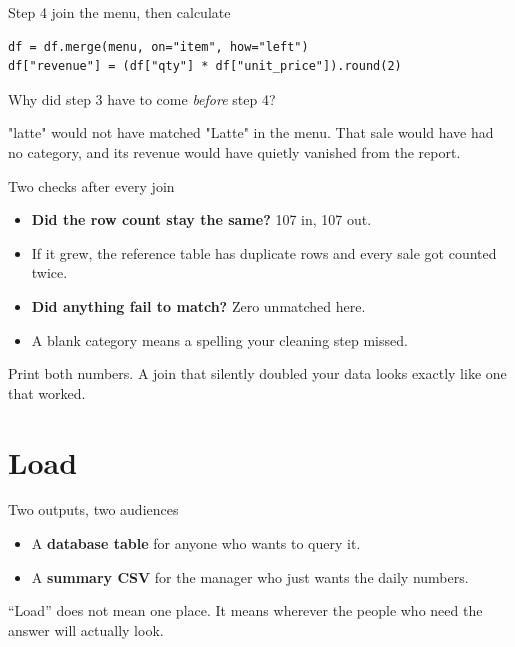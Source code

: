 \documentclass[aspectratio=169,10pt]{beamer}
\newcommand{\py}[1]{{\ttfamily\footnotesize\color{ink}#1}}
\begin{document}
\begin{frame}[fragile]{Step 4 \textemdash{} join the menu, then calculate}
\begin{lstlisting}
df = df.merge(menu, on="item", how="left")
df["revenue"] = (df["qty"] * df["unit_price"]).round(2)
\end{lstlisting}

  \pause
  \begin{ask}
    \small
    Why did step 3 have to come \emph{before} step 4?
  \end{ask}

  \pause
  \begin{watch}
    \small
    \py{"latte"} would not have matched \py{"Latte"} in the menu. That sale would have had no
    category, and its revenue would have \alert{quietly vanished} from the report.
  \end{watch}
\end{frame}

\begin{frame}{Two checks after every join}
  \begin{itemize}[<+->]
    \item \textbf{Did the row count stay the same?} 107 in, 107 out.
    \item If it grew, the reference table has duplicate rows and every sale got counted twice.
    \item \textbf{Did anything fail to match?} Zero unmatched here.
    \item A blank category means a spelling your cleaning step missed.
  \end{itemize}

  \pause\vfill
  \begin{prac}
    \small
    Print both numbers. A join that silently doubled your data looks exactly like one that worked.
  \end{prac}
\end{frame}

\section{Load}

\begin{frame}{Two outputs, two audiences}
  \begin{itemize}[<+->]
    \item A \textbf{database table} \textemdash{} for anyone who wants to query it.
    \item A \textbf{summary CSV} \textemdash{} for the manager who just wants the daily numbers.
  \end{itemize}

  \pause\vfill
  \begin{aside}
    \small
    ``Load'' does not mean one place. It means wherever the people who need the answer will actually
    look.
  \end{aside}
\end{frame}
\end{document}
